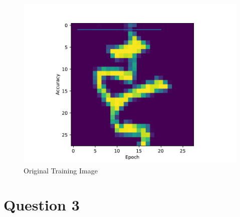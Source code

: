 \begin{questions}
        \begin{figure}[H]
            \centering
            \includegraphics[scale=0.4]{original_image.pdf}
            \caption{Original Training Image}
            \label{fig:orig}
        \end{figure}

    \end{questions}

    \newpage

    \section*{Question 3}
    \begin{questions}
        \question
        \begin{parts}
            \part %

            \part %

            \part %


        \end{parts}
    \end{questions}

